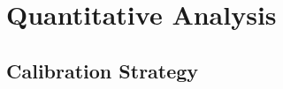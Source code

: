 \documentclass[onehalfspacing,11pt]{article}
\begin{document}
	
	
	\section{Quantitative Analysis}\label{sec:quant}
	\subsection{Calibration Strategy}\label{sec:calstrat}
	
\end{document}
